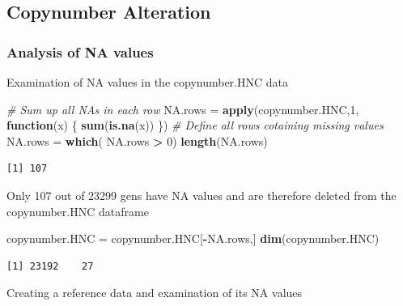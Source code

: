 \documentclass[]{article}
\newenvironment{Shaded}{\begin{snugshade}}{\end{snugshade}}
\newcommand{\KeywordTok}[1]{\textcolor[rgb]{0.13,0.29,0.53}{\textbf{#1}}}
\newcommand{\DecValTok}[1]{\textcolor[rgb]{0.00,0.00,0.81}{#1}}
\newcommand{\StringTok}[1]{\textcolor[rgb]{0.31,0.60,0.02}{#1}}
\newcommand{\CommentTok}[1]{\textcolor[rgb]{0.56,0.35,0.01}{\textit{#1}}}
\newcommand{\ControlFlowTok}[1]{\textcolor[rgb]{0.13,0.29,0.53}{\textbf{#1}}}
\newcommand{\OperatorTok}[1]{\textcolor[rgb]{0.81,0.36,0.00}{\textbf{#1}}}
\newcommand{\NormalTok}[1]{#1}
\begin{document}
\subsection{Copynumber Alteration}\label{copynumber-alteration}

\subsubsection{Analysis of NA values}\label{analysis-of-na-values}

Examination of NA values in the copynumber.HNC data

\begin{Shaded}
\begin{Highlighting}[]
\CommentTok{# Sum up all NAs in each row}
\NormalTok{NA.rows =}\StringTok{ }\KeywordTok{apply}\NormalTok{(copynumber.HNC,}\DecValTok{1}\NormalTok{, }\ControlFlowTok{function}\NormalTok{(x) \{}
          \KeywordTok{sum}\NormalTok{(}\KeywordTok{is.na}\NormalTok{(x))}
\NormalTok{\})}
\CommentTok{# Define all rows cotaining missing values}
\NormalTok{NA.rows =}\StringTok{ }\KeywordTok{which}\NormalTok{( NA.rows }\OperatorTok{>}\StringTok{ }\DecValTok{0}\NormalTok{)}
\KeywordTok{length}\NormalTok{(NA.rows)}
\end{Highlighting}
\end{Shaded}

\begin{verbatim}
[1] 107
\end{verbatim}

Only 107 out of 23299 gens have NA values and are therefore deleted from
the copynumber.HNC dataframe

\begin{Shaded}
\begin{Highlighting}[]
\NormalTok{copynumber.HNC =}\StringTok{ }\NormalTok{copynumber.HNC[}\OperatorTok{-}\NormalTok{NA.rows,]}
\KeywordTok{dim}\NormalTok{(copynumber.HNC)}
\end{Highlighting}
\end{Shaded}

\begin{verbatim}
[1] 23192    27
\end{verbatim}

Creating a reference data and examination of its NA values

\begin{Shaded}
\end{Shaded}
\end{document}
